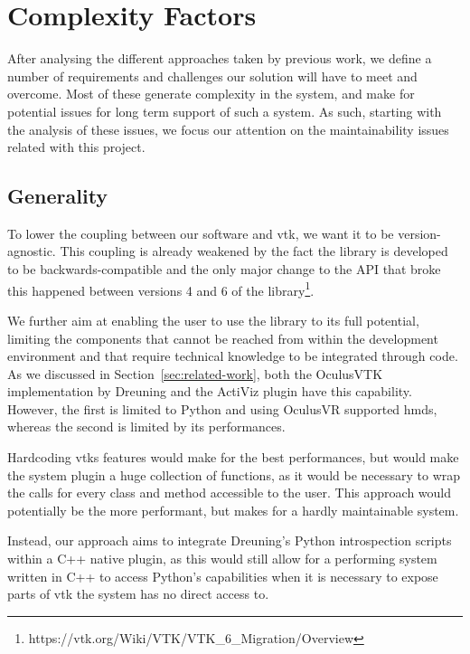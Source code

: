 \chapter{Complexity Factors}
\label{ch:unmaintainability}

After analysing the different approaches taken by previous work, we define a number of requirements and challenges our solution will have to meet and overcome. Most of these generate complexity in the system, and make for potential issues for long term support of such a system. As such, starting with the analysis of these issues, we focus our attention on the maintainability issues related with this project.

\section{Generality}

To lower the coupling between our software and \acrshort{vtk}, we want it to be version-agnostic. This coupling is already weakened by the fact the library is developed to be backwards-compatible and the only major change to the API that broke this happened between versions 4 and 6 of the library\footnote{https://vtk.org/Wiki/VTK/VTK\_6\_Migration/Overview}. 

We further aim at enabling the user to use the library to its full potential, limiting the components that cannot be reached from within the development environment and that require technical knowledge to be integrated through code. As we discussed in Section~\ref{sec:related-work}, both the OculusVTK implementation by Dreuning and the ActiViz plugin have this capability. However, the first is limited to Python and using OculusVR supported \acrshort{hmd}s, whereas the second is limited by its performances. 

Hardcoding \acrshort{vtk}s features would make for the best performances, but would make the system plugin a huge collection of functions, as it would be necessary to wrap the calls for every class and method accessible to the user. This approach would potentially be the more performant, but makes for a hardly maintainable system.

Instead, our approach aims to integrate Dreuning's Python introspection scripts within a C++ native plugin, as this would still allow for a performing system written in C++ to access Python's capabilities when it is necessary to expose parts of \acrshort{vtk} the system has no direct access to.

